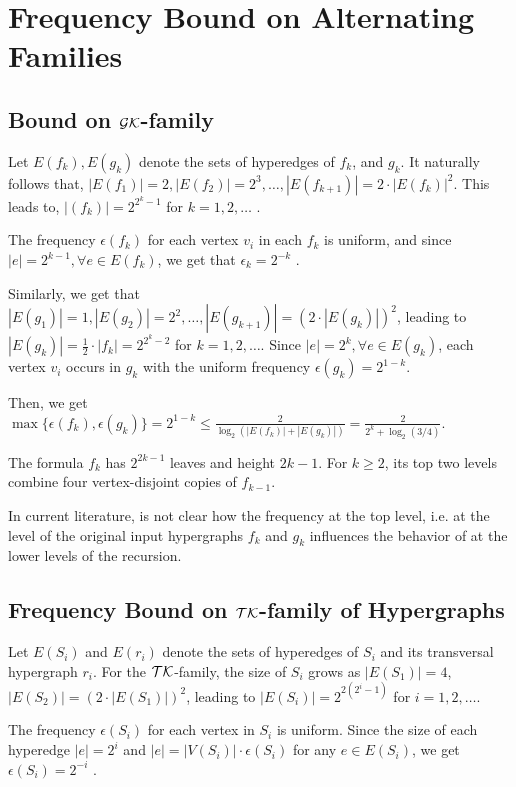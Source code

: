 \section{Frequency Bound on Alternating Families}

\subsection{Bound on \texorpdfstring{$\mathcal{GK}$}{GK}-family}

Let $E(f_k),E(g_k)$ denote the sets of hyperedges of $f_k$, and $g_k$. It naturally follows that, $|E(f_1)|=2,|E(f_2)|=2^3,\dots,|E(f_{k+1})|=2\cdot|E(f_k)|^2$. This leads to, $|(f_k)|=2^{2^k-1}$ for $k=1,2,\dots$ .

The frequency $\epsilon(f_k)$ for each vertex $v_i$ in each $f_k$ is uniform, and since $|e|=2^{k-1},\forall e\in E(f_k)$, we get that $\epsilon_k=2^{-k}$ .

Similarly, we get that $|E(g_1)|=1,|E(g_2)|=2^2,\dots,|E(g_{k+1})|=(2\cdot|E(g_k)|)^2$, leading to $|E(g_k)|=\frac{1}{2}\cdot|f_k|=2^{2^k-2}$ for $k=1,2,\dots$. Since $|e|=2^k,\forall e\in E(g_k)$, each vertex $v_i$ occurs in $g_k$ with the uniform frequency $\epsilon(g_k)=2^{1-k}$.

Then, we get $\max\{\epsilon(f_k),\epsilon(g_k)\}=2^{1-k}\leq\frac{2}{\log_2(|E(f_k)|+|E(g_k)|)}=\frac{2}{2^k+\log_2(3/4)}$.

The formula $f_k$ has $2^{2k-1}$ leaves and height $2k-1$. For $k\geq2$, its top two levels combine four vertex-disjoint copies of $f_{k-1}$.

In current literature, is not clear how the frequency at the top level, i.e. at the level of the original input hypergraphs $f_k$ and $g_k$ influences the behavior of \FKA{} at the lower levels of the recursion.

\subsection{Frequency Bound on \texorpdfstring{$\mathcal{TK}$}{TK}-family of Hypergraphs}

Let $E(S_i)$ and $E(r_i)$ denote the sets of hyperedges of $S_i$ and its transversal hypergraph $r_i$. For the $\mathcal{TK}$-family, the size of $S_i$ grows as $|E(S_1)|=4$, $|E(S_2)|=(2\cdot|E(S_1)|)^2$, leading to $|E(S_i)|=2^{2(2^i-1)}$ for $i=1,2,\dots$.

The frequency $\epsilon(S_i)$ for each vertex in $S_i$ is uniform. Since the size of each hyperedge $|e|=2^i$ and $|e|=|V(S_i)|\cdot\epsilon(S_i)$ for any $e\in E(S_i)$, we get $\epsilon(S_i)=2^{-i}$ .

